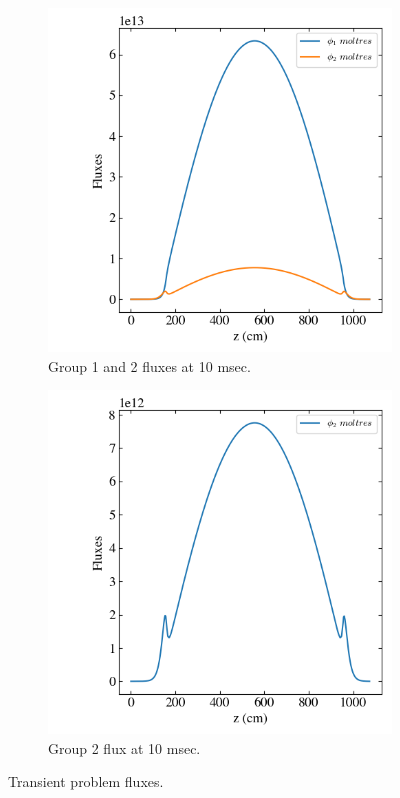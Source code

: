 \documentclass[11pt,letterpaper]{article}
\begin{document}
	\begin{figure}[htbp!]
		\centering
		\begin{subfigure}[t]{0.4\textwidth}
			\centering
			\includegraphics[width=\linewidth]{2D-fuel-reflec-action-delayed}
			\caption{Group 1 and 2 fluxes at 10 msec.}
		\end{subfigure}
		\begin{subfigure}[t]{0.4\textwidth}
			\centering
			\includegraphics[width=\linewidth]{2D-fuel-reflec-action-delayed-g2}
			\caption{Group 2 flux at 10 msec.}
		\end{subfigure}
		\hfill
		\caption{Transient problem fluxes.}
		\label{fig:2D-fuel-reflec-action-delayed}
	\end{figure}

\pagebreak

% 
\end{document}
